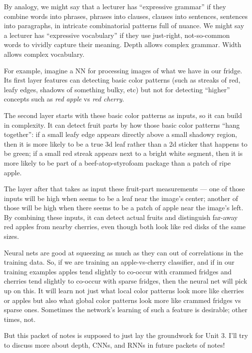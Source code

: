   By analogy, we might say that a lecturer has ``expressive grammar'' if they
  combine words into phrases, phrases into clauses, clauses into sentences,
  sentences into paragraphs, in intricate combinatorial patterns full of
  nuance.  We might say a lecturer has ``expressive vocabulary'' if they use
  just-right, not-so-common words to vividly capture their meaning.  Depth
  allows complex grammar.  Width allows complex vocabulary.

  For example, imagine a NN for processing images of what we have in our
  fridge.  Its first layer features can detecting basic color
  patterns (such as streaks of red, leafy edges, shadows of something bulky,
  etc) but not for detecting ``higher'' concepts such as \emph{red apple} vs
  \emph{red cherry}.

  The second layer starts with these basic color patterns as inputs, so it can
  build in complexity.  It can detect fruit parts by how those basic color
  patterns ``hang together'': if a small leafy edge appears directly above a
  small shadowy region, then it is more likely to be a true 3d leaf rather than
  a 2d sticker that happens to be green; if a small red streak appears next to
  a bright white segment, then it is more likely to be part of a
  beef-atop-styrofoam package than a patch of ripe apple.

  The layer after that takes as input these fruit-part measurements --- one of
  those inputs will be high when seems to be a leaf near the image's center;
  another of those will be high when there seems to be a patch of apple near
  the image's left.  By combining these inputs, it can detect actual fruits and
  distinguish far-away red apples from nearby cherries, even though both look
  like red disks of the same sizes.

  Neural nets are good at squeezing as much as they can out of correlations in
  the training data.  So, if we are training an apple-vs-cherry classifier, and
  if in our training examples apples tend slightly to co-occur with crammed
  fridges
  and cherries tend slightly to co-occur with sparse fridges, then the neural
  net will pick up on this.  It will learn not just what local color patterns
  look more like cherries or apples but also what global color patterns look
  more like crammed fridges vs sparse ones.  Sometimes the network's learning
  of such a feature is desirable; other times, not.

  But this packet of notes is supposed to just lay the groundwork for Unit 3.
  I'll try to discuss more about depth, CNNs, and RNNs in future packets of
  notes!
